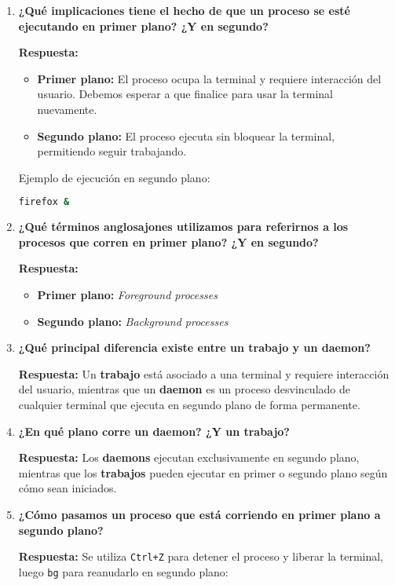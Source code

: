 \documentclass[a4paper,12pt]{article}
\begin{document}
\begin{enumerate}[label=\textbf{Pregunta \arabic*.},left=0pt,itemsep=1.5em]
\newpage

\item \textbf{¿Qué implicaciones tiene el hecho de que un proceso se esté ejecutando en primer plano? ¿Y en segundo?}

\textbf{Respuesta:}
\begin{itemize}
    \item \textbf{Primer plano:} El proceso ocupa la terminal y requiere interacción del usuario. Debemos esperar a que finalice para usar la terminal nuevamente.
    \item \textbf{Segundo plano:} El proceso ejecuta sin bloquear la terminal, permitiendo seguir trabajando.
\end{itemize}

Ejemplo de ejecución en segundo plano:
\begin{lstlisting}[language=bash]
firefox &
\end{lstlisting}

\item \textbf{¿Qué términos anglosajones utilizamos para referirnos a los procesos que corren en primer plano? ¿Y en segundo?}

\textbf{Respuesta:}
\begin{itemize}
    \item \textbf{Primer plano:} \textit{Foreground processes}
    \item \textbf{Segundo plano:} \textit{Background processes}
\end{itemize}

\item \textbf{¿Qué principal diferencia existe entre un trabajo y un daemon?}

\textbf{Respuesta:} Un \textbf{trabajo} está asociado a una terminal y requiere interacción del usuario, mientras que un \textbf{daemon} es un proceso desvinculado de cualquier terminal que ejecuta en segundo plano de forma permanente.

\item \textbf{¿En qué plano corre un daemon? ¿Y un trabajo?}

\textbf{Respuesta:} Los \textbf{daemons} ejecutan exclusivamente en segundo plano, mientras que los \textbf{trabajos} pueden ejecutar en primer o segundo plano según cómo sean iniciados.

\item \textbf{¿Cómo pasamos un proceso que está corriendo en primer plano a segundo plano?}

\textbf{Respuesta:} Se utiliza \texttt{Ctrl+Z} para detener el proceso y liberar la terminal, luego \texttt{bg} para reanudarlo en segundo plano:


\end{enumerate}
\end{document}
